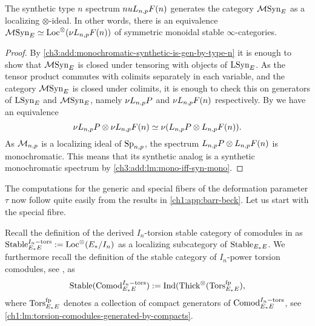 \begin{lemma}
    The synthetic type $n$ spectrum $nu L_{n,p} F(n)$ generates the category $\mathcal{M}\mathrm{Syn}_{E}$ as a localizing $\otimes$-ideal. In other words, there is an equivalence $\mathcal{M}\mathrm{Syn}_{E} \simeq \operatorname{Loc}^\otimes(\nu L_{n,p} F(n))$ of symmetric monoidal stable $\infty$-categories. 
\end{lemma}
\begin{proof}
    By \cref{ch3:add:monochromatic-synthetic-is-gen-by-type-n} it is enough to show that $\mathcal{M}\mathrm{Syn}_{E}$ is closed under tensoring with objects of $\mathrm{LSyn}_{E}$. As the tensor product commutes with colimits separately in each variable, and the category $\mathcal{M}\mathrm{Syn}_{E}$ is closed under colimits, it is enough to check this on generators of $\mathrm{LSyn}_{E}$ and $\mathcal{M}\mathrm{Syn}_{E}$, namely $\nu L_{n,p} P$ and $\nu L_{n,p} F(n)$ respectively. By \cite[4.24]{pstragowski_2022} we have an equivalence 
    \[\nu L_{n,p} P \otimes \nu L_{n,p} F(n) \simeq \nu(L_{n,p} P \otimes L_{n,p} F(n)).\]
    As $\mathcal{M}_{n,p}$ is a localizing ideal of $\mathrm{Sp}_{n,p}$, the spectrum $L_{n,p} P \otimes L_{n,p} F(n)$ is monochromatic. This means that its synthetic analog is a synthetic monochromatic spectrum by \cref{ch3:add:lm:mono-iff-syn-mono}. 
\end{proof}

The computations for the generic and special fibers of the deformation parameter $\tau$ now follow quite easily from the results in \cref{ch1:app:barr-beck}. Let us start with the special fibre. 

Recall the definition of the derived $I_n$-torsion stable category of comodules in \cite[2.4]{barthel-heard-valenzuela_2020} as $\mathrm{Stable}_{E_*E}^{I_n-\mathrm{tors}} := \operatorname{Loc}^\otimes(E_{*}/I_n)$ as a localizing subcategory of $\mathrm{Stable}_{E_*E}$. We furthermore recall the definition of the stable category of $I_n$-power torsion comodules, see \cite[3.5]{barthel-heard-valenzuela_2020}, as 
\[\mathrm{Stable}(\mathrm{Comod}_{E_*E}^{I_n-\mathrm{tors}}) := \operatorname{Ind}(\operatorname{Thick}^\otimes(\mathrm{Tors}_{E_*E}^{\mathrm{fp}}),\]
where $\mathrm{Tors}_{E_*E}^{\mathrm{fp}}$ denotes a collection of compact generators of $\mathrm{Comod}_{E_*E}^{I_n-\mathrm{tors}}$, see \cref{ch1:lm:torsion-comodules-generated-by-compacts}. 

